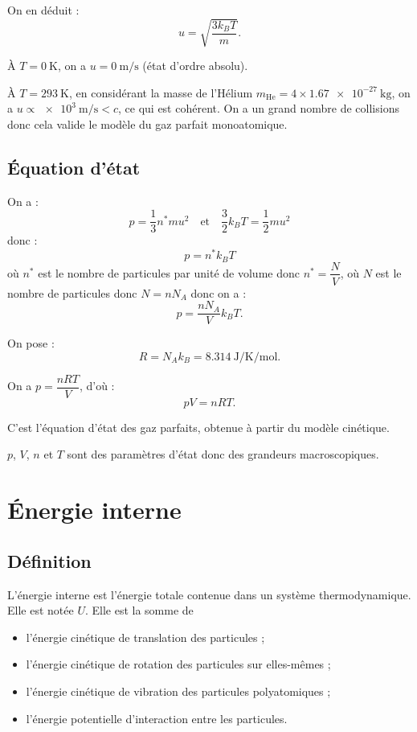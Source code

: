 On en déduit : \[u=\sqrt{\dfrac{3k_BT}{m}}.\]

À \(T=\SI{0}{\kelvin}\), on a \(u=\SI{0}{\metre\per\second}\) (état d'ordre absolu).

À \(T=\SI{293}{\kelvin}\), en considérant la masse de l'Hélium \(m_{\text{He}}=4\times\SI{1.67e-27}{\kilo\gram}\), on a \(u\propto\SI{e3}{\metre\per\second}<c\), ce qui est cohérent. On a un grand nombre de collisions donc cela valide le modèle du gaz parfait monoatomique.

\subsection{Équation d'état}

On a : \[p=\dfrac{1}{3}n^*mu^2\quad\text{et}\quad\dfrac{3}{2}k_BT=\dfrac{1}{2}mu^2\] donc : \[p=n^*k_BT\] où \(n^*\) est le nombre de particules par unité de volume donc \(n^*=\dfrac{N}{V}\), où \(N\) est le nombre de particules donc \(N=nN_A\) donc on a : \[p=\dfrac{nN_A}{V}k_BT.\]

On pose : \[R=N_Ak_B=\SI{8.314}{\joule\per\kelvin\per\mole}.\]

On a \(p=\dfrac{nRT}{V}\), d'où : \[pV=nRT.\]

C'est l'équation d'état des gaz parfaits, obtenue à partir du modèle cinétique.

\(p\), \(V\), \(n\) et \(T\) sont des paramètres d'état donc des grandeurs macroscopiques.

\section{Énergie interne}

\subsection{Définition}

L'énergie interne est l'énergie totale contenue dans un système thermodynamique. Elle est notée \(U\). Elle est la somme de \begin{itemize}
\item l'énergie cinétique de translation des particules ;

\item l'énergie cinétique de rotation des particules sur elles-mêmes ;

\item l'énergie cinétique de vibration des particules polyatomiques ;

\item l'énergie potentielle d'interaction entre les particules.
\end{itemize}

